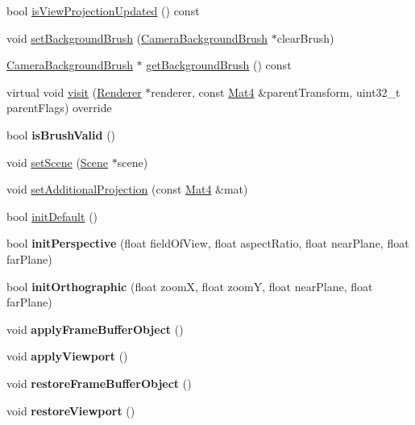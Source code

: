 \begin{DoxyCompactItemize}
\item 
bool \hyperlink{classCamera_afba312d6b30f3d137e9c173f7fa334e6}{is\+View\+Projection\+Updated} () const
\item 
void \hyperlink{classCamera_a1804790d419a1d952752f81680d98d1f}{set\+Background\+Brush} (\hyperlink{classCameraBackgroundBrush}{Camera\+Background\+Brush} $\ast$clear\+Brush)
\item 
\hyperlink{classCameraBackgroundBrush}{Camera\+Background\+Brush} $\ast$ \hyperlink{classCamera_a7994f962fbded68295f7b15f3046bdd8}{get\+Background\+Brush} () const
\item 
virtual void \hyperlink{classCamera_add749a2d2338f0373a6a440e4cba5afa}{visit} (\hyperlink{classRenderer}{Renderer} $\ast$renderer, const \hyperlink{classMat4}{Mat4} \&parent\+Transform, uint32\+\_\+t parent\+Flags) override
\item 
\mbox{\label{classCamera_a3af85368441d5aa6a463ae20777065fd}} 
bool {\bfseries is\+Brush\+Valid} ()
\item 
void \hyperlink{classCamera_ac35b13397b0add2c502bef10a46f0e17}{set\+Scene} (\hyperlink{classScene}{Scene} $\ast$scene)
\item 
void \hyperlink{classCamera_ab3d0364f67e78080b9bacee82678c542}{set\+Additional\+Projection} (const \hyperlink{classMat4}{Mat4} \&mat)
\item 
bool \hyperlink{classCamera_a4bdc70b1156c5b4cbdb5706cb75fb598}{init\+Default} ()
\item 
\mbox{\label{classCamera_ad176536923ab1ca8276260f40cdac6e2}} 
bool {\bfseries init\+Perspective} (float field\+Of\+View, float aspect\+Ratio, float near\+Plane, float far\+Plane)
\item 
\mbox{\label{classCamera_ac68ab51e1a13d1e1d473a829d3633028}} 
bool {\bfseries init\+Orthographic} (float zoomX, float zoomY, float near\+Plane, float far\+Plane)
\item 
\mbox{\label{classCamera_a93b40b1f7c908321a7336455ec48091f}} 
void {\bfseries apply\+Frame\+Buffer\+Object} ()
\item 
\mbox{\label{classCamera_ac21c04a71fc49783b64c5e32f4f1d128}} 
void {\bfseries apply\+Viewport} ()
\item 
\mbox{\label{classCamera_a2a1f9bbd4929dc623430d3de6cf32eb1}} 
void {\bfseries restore\+Frame\+Buffer\+Object} ()
\item 
\mbox{\label{classCamera_abe884ec7b69ff038dfae1ec47e6cd6d8}} 
void {\bfseries restore\+Viewport} ()
\end{DoxyCompactItemize}
